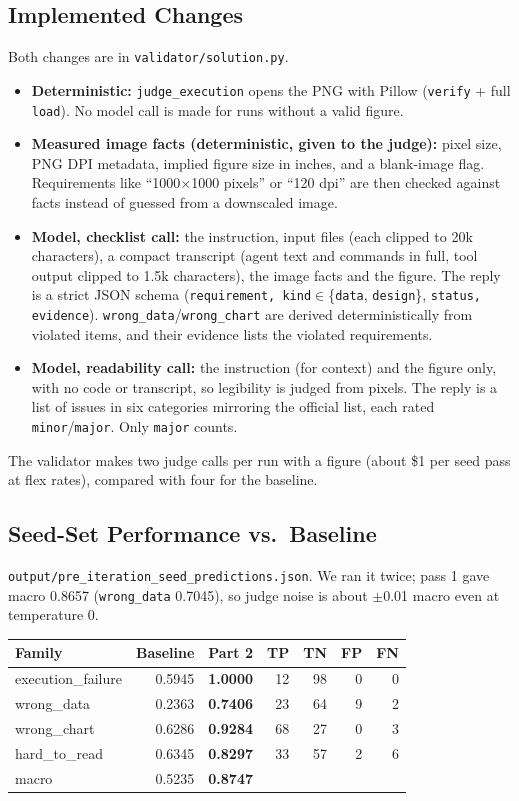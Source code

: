 \documentclass[11pt]{article}
\begin{document}
\subsection{Implemented Changes}
Both changes are in \texttt{validator/solution.py}.
\begin{itemize}
\item \textbf{Deterministic:} \texttt{judge\_execution} opens the PNG with
Pillow (\texttt{verify} + full \texttt{load}). No model call is made for runs
without a valid figure.
\item \textbf{Measured image facts (deterministic, given to the judge):} pixel
size, PNG DPI metadata, implied figure size in inches, and a blank-image flag.
Requirements like ``1000$\times$1000 pixels'' or ``120 dpi'' are then checked
against facts instead of guessed from a downscaled image.
\item \textbf{Model, checklist call:} the instruction, input files (each clipped
to 20k characters), a compact transcript (agent text and commands in full,
tool output clipped to 1.5k characters), the image facts and the figure. The
reply is a strict JSON schema
(\texttt{requirement, kind}$\in$\{\texttt{data}, \texttt{design}\},
\texttt{status, evidence}). \texttt{wrong\_data}/\texttt{wrong\_chart} are
derived deterministically from violated items, and their evidence lists the
violated requirements.
\item \textbf{Model, readability call:} the instruction (for context) and the
figure only, with no code or transcript, so legibility is judged from pixels.
The reply is a list of issues in six categories mirroring the official list,
each rated \texttt{minor}/\texttt{major}. Only \texttt{major} counts.
\end{itemize}
The validator makes two judge calls per run with a figure (about \$1 per seed
pass at flex rates), compared with four for the baseline.

\subsection{Seed-Set Performance vs.\ Baseline}
\texttt{output/pre\_iteration\_seed\_predictions.json}. We ran it twice; pass 1
gave macro 0.8657 (\texttt{wrong\_data} 0.7045), so judge noise is about $\pm$0.01
macro even at temperature 0.

\begin{center}
\begin{tabular}{lrrrrrr}
\toprule
Family & Baseline & Part 2 & TP & TN & FP & FN \\
\midrule
execution\_failure & 0.5945 & \textbf{1.0000} & 12 & 98 & 0 & 0 \\
wrong\_data & 0.2363 & \textbf{0.7406} & 23 & 64 & 9 & 2 \\
wrong\_chart & 0.6286 & \textbf{0.9284} & 68 & 27 & 0 & 3 \\
hard\_to\_read & 0.6345 & \textbf{0.8297} & 33 & 57 & 2 & 6 \\
\midrule
macro & 0.5235 & \textbf{0.8747} & & & & \\
\bottomrule
\end{tabular}
\end{center}
\end{document}
